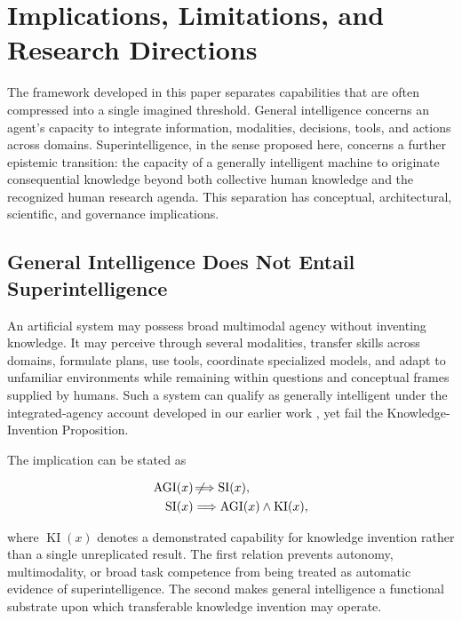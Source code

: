 \section{\textbf{Implications, Limitations, and Research Directions}}
\label{sec:implications}

The framework developed in this paper separates capabilities that are often
compressed into a single imagined threshold. General intelligence concerns an
agent's capacity to integrate information, modalities, decisions, tools, and
actions across domains. Superintelligence, in the sense proposed here, concerns
a further epistemic transition: the capacity of a generally intelligent
machine to originate consequential knowledge beyond both collective human
knowledge and the recognized human research agenda. This separation has
conceptual, architectural, scientific, and governance implications.

\subsection{\textbf{General Intelligence Does Not Entail Superintelligence}}

An artificial system may possess broad multimodal agency without inventing
knowledge. It may perceive through several modalities, transfer skills across
domains, formulate plans, use tools, coordinate specialized models, and adapt
to unfamiliar environments while remaining within questions and conceptual
frames supplied by humans. Such a system can qualify as generally intelligent
under the integrated-agency account developed in our earlier work
\cite{zohourian2026agi}, yet fail the Knowledge-Invention Proposition.

The implication can be stated as

\begin{equation}
\begin{aligned}
\operatorname{AGI}(x)
&\not\!\Longrightarrow
\operatorname{SI}(x),\\
\operatorname{SI}(x)
&\Longrightarrow
\operatorname{AGI}(x)
\land
\operatorname{KI}(x),
\end{aligned}
\label{eq:agi_si_implication}
\end{equation}

where $\operatorname{KI}(x)$ denotes a demonstrated capability for knowledge
invention rather than a single unreplicated result. The first relation prevents
autonomy, multimodality, or broad task competence from being treated as
automatic evidence of superintelligence. The second makes general intelligence
a functional substrate upon which transferable knowledge invention may operate.

